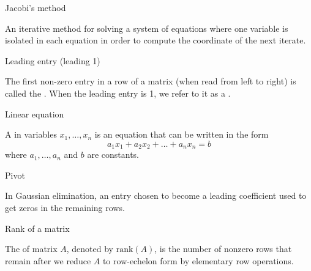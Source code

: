 \documentclass{ximera}
\begin{document}
Jacobi's method
\begin{expandable}
    An iterative method for solving a system of equations where one variable is isolated in each equation in order to compute the coordinate of the next iterate.
\end{expandable}


Leading entry (leading 1)
\begin{expandable}
    The first non-zero entry in a row of a matrix (when read from left to right) is called the .  When the leading entry is 1, we refer to it as a .
\end{expandable}


Linear equation
\begin{expandable}
    A  in variables $x_1, \ldots, x_n$ is an equation that can be written in the form
$$a_1x_1+a_2x_2+\ldots +a_nx_n=b$$
where $a_1,\ldots ,a_n$ and $b$ are constants.
\end{expandable}



Pivot
\begin{expandable}
    In Gaussian elimination, an entry chosen to become a leading coefficient used to get zeros in the remaining rows.
\end{expandable}



Rank of a matrix
\begin{expandable}
    The  of matrix $A$, denoted by $\mbox{rank}(A)$, is the number of nonzero rows that remain after we reduce $A$ to row-echelon form by elementary row operations.
\end{expandable}
\end{document}

